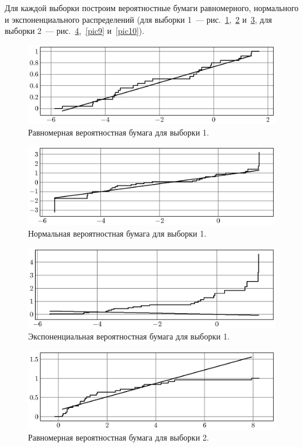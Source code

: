 Для каждой выборки построим вероятностные бумаги равномерного, нормального и 
экспоненциального распределений (для выборки 1~--- 
рис.~\ref{pic5},~\ref{pic6} и~\ref{pic7}, 
для выборки 2~--- рис.~\ref{pic8},~\ref{pic9} и~\ref{pic10}).

\begin{figure}[h]
  \includegraphics[scale=1]{images/st.7.eps}
  \caption{Равномерная вероятностная бумага для выборки 1.}\label{pic5}
\end{figure}

\begin{figure}[h]
  \includegraphics[scale=1]{images/st.5.eps}
  \caption{Нормальная вероятностная бумага для выборки 1.}\label{pic6}
\end{figure}

\begin{figure}[h]
  \includegraphics[scale=1]{images/st.6.eps}
  \caption{Экспоненциальная вероятностная бумага для выборки 1.}\label{pic7}
\end{figure}

\begin{figure}[h]
  \includegraphics[scale=1]{images/st.10.eps}
  \caption{Равномерная вероятностная бумага для выборки 2.}\label{pic8}
\end{figure}

